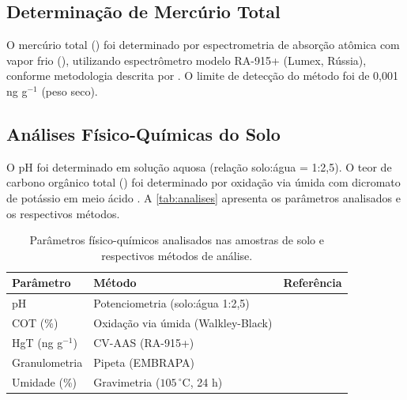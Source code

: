 \subsection{Determinação de Mercúrio Total}

O mercúrio total () foi determinado
por espectrometria de absorção atômica com vapor frio (), utilizando espectrômetro
modelo RA-915+ (Lumex, Rússia), conforme metodologia descrita por
. O limite de detecção do método foi
de 0,001 ng g$^{-1}$ (peso seco).

\subsection{Análises Físico-Químicas do Solo}

O pH foi determinado em solução aquosa (relação solo:água = 1:2,5).
O teor de carbono orgânico total ()
foi determinado por oxidação via úmida com dicromato de potássio em meio
ácido \cite{exemplo:livro:2020}. A \autoref{tab:analises} apresenta
os parâmetros analisados e os respectivos métodos.

\begin{table}[H]
  \centering
  \caption{Parâmetros físico-químicos analisados nas amostras de solo
           e respectivos métodos de análise.}
  \label{tab:analises}
  \begin{tabularx}{\textwidth}{lXl}
    \toprule
    \textbf{Parâmetro} & \textbf{Método} & \textbf{Referência} \\
    \midrule
    pH                 & Potenciometria (solo:água 1:2,5)       & \cite{exemplo:livro:2020} \\
    \thinrule
    COT (\%)           & Oxidação via úmida (Walkley-Black)     & \cite{exemplo:livro:2020} \\
    \thinrule
    HgT (ng g$^{-1}$) & CV-AAS (RA-915+)                       & \cite{exemplo:artigo:2024} \\
    \thinrule
    Granulometria      & Pipeta (EMBRAPA)                       & \cite{exemplo:relatorio:2021} \\
    \thinrule
    Umidade (\%)       & Gravimetria ($105\,^\circ\text{C}$, 24 h)          & \cite{exemplo:livro:2020} \\
    \bottomrule
  \end{tabularx}
\end{table}

